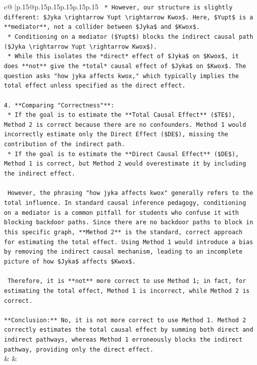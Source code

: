 \documentclass{article}
\begin{document}
{\begin{supertabular}{c@{$\;$}|p{.15\linewidth}@{}p{.15\linewidth}p{.15\linewidth}p{.15\linewidth}p{.15\linewidth}p{.15\linewidth}}
{{{\texttt{    *   However, our structure is slightly different: \$Jyka \textbackslash{}rightarrow Yupt \textbackslash{}rightarrow Kwox\$. Here, \$Yupt\$ is a **mediator**, not a collider between \$Jyka\$ and \$Kwox\$.} \\
\texttt{    *   Conditioning on a mediator (\$Yupt\$) blocks the indirect causal path (\$Jyka \textbackslash{}rightarrow Yupt \textbackslash{}rightarrow Kwox\$).} \\
\texttt{    *   While this isolates the *direct* effect of \$Jyka\$ on \$Kwox\$, it does **not** give the *total* causal effect of \$Jyka\$ on \$Kwox\$. The question asks "how jyka affects kwox," which typically implies the total effect unless specified as the direct effect.} \\
\\ 
\texttt{4.  **Comparing "Correctness"**:} \\
\texttt{    *   If the goal is to estimate the **Total Causal Effect** (\$TE\$), Method 2 is correct because there are no confounders. Method 1 would incorrectly estimate only the Direct Effect (\$DE\$), missing the contribution of the indirect path.} \\
\texttt{    *   If the goal is to estimate the **Direct Causal Effect** (\$DE\$), Method 1 is correct, but Method 2 would overestimate it by including the indirect effect.} \\
\\ 
\texttt{    However, the phrasing "how jyka affects kwox" generally refers to the total influence. In standard causal inference pedagogy, conditioning on a mediator is a common pitfall for students who confuse it with blocking backdoor paths. Since there are no backdoor paths to block in this specific graph, **Method 2** is the standard, correct approach for estimating the total effect. Using Method 1 would introduce a bias by removing the indirect causal mechanism, leading to an incomplete picture of how \$Jyka\$ affects \$Kwox\$.} \\
\\ 
\texttt{    Therefore, it is **not** more correct to use Method 1; in fact, for estimating the total effect, Method 1 is incorrect, while Method 2 is correct.} \\
\\ 
\texttt{**Conclusion:** No, it is not more correct to use Method 1. Method 2 correctly estimates the total causal effect by summing both direct and indirect pathways, whereas Method 1 erroneously blocks the indirect pathway, providing only the direct effect.} \\
            }
        }
    }
    & & \\ \\


\end{supertabular}}
\end{document}
